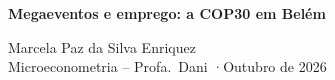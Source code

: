 \documentclass[12pt,a4paper]{report}
\begin{document}
\begin{titlepage}\centering\vspace*{4cm}
{\LARGE\bfseries Megaeventos e emprego: a COP30 em Belém\par}\vspace{1.5cm}
\vspace{6pt}
Marcela Paz da Silva Enriquez\\
Microeconometria -- Profa.\ Dani \quad·\quad Outubro de 2026
\vfill\end{titlepage}



\end{document}

